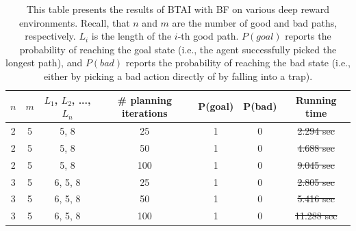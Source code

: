 \documentclass[twoside,11pt]{article}
\providecommand{\DIFadd}[1]{{\protect\color{blue}\uwave{#1}}} %
\providecommand{\DIFdel}[1]{{\protect\color{red}\sout{#1}}}                      %
\providecommand{\DIFaddFL}[1]{\DIFadd{#1}} %
\providecommand{\DIFdelFL}[1]{\DIFdel{#1}} %
\providecommand{\DIFaddbeginFL}{} %
\providecommand{\DIFaddendFL}{} %
\providecommand{\DIFdelbeginFL}{} %
\providecommand{\DIFdelendFL}{} %
\begin{document}
\begin{table}[H]
\centering
\begin{tabular}{ |c|c|c|c|c|c|c| }
 \hline
 $n$ & $m$ & $L_1$, $L_2$, ..., $L_n$  & \# planning iterations & P(goal) & P(bad) & Running time \DIFaddbeginFL \DIFaddFL{(ms)}\DIFaddendFL \\
 \hline
 2 & 5 & 5, 8 & 25 & 1 & 0 & \DIFdelbeginFL \DIFdelFL{2.294 sec}\DIFdelendFL \DIFaddbeginFL \DIFaddFL{$23.42 \pm 4.966$ }\DIFaddendFL \\
 \hline
 2 & 5 & 5, 8 & 50 & 1 & 0 & \DIFdelbeginFL \DIFdelFL{4.688 sec}\DIFdelendFL \DIFaddbeginFL \DIFaddFL{$43.37 \pm 2.743$}\DIFaddendFL \\
 \hline
 2 & 5 & 5, 8 & 100 & 1 & 0 & \DIFdelbeginFL \DIFdelFL{9.045 sec}\DIFdelendFL \DIFaddbeginFL \DIFaddFL{$110.58 \pm 29.586$}\DIFaddendFL \\
 \hline
 3 & 5 & 6, 5, 8 & 25 & 1 & 0 & \DIFdelbeginFL \DIFdelFL{2.805 sec}\DIFdelendFL \DIFaddbeginFL \DIFaddFL{$26.7 \pm 2.405$}\DIFaddendFL \\
 \hline
 3 & 5 & 6, 5, 8 & 50 & 1 & 0 & \DIFdelbeginFL \DIFdelFL{5.416 sec}\DIFdelendFL \DIFaddbeginFL \DIFaddFL{$61.41 \pm 45.112$}\DIFaddendFL \\
 \hline
 3 & 5 & 6, 5, 8 & 100 & 1 & 0 & \DIFdelbeginFL \DIFdelFL{11.288 sec}\DIFdelendFL \DIFaddbeginFL \DIFaddFL{$120.25 \pm 12.722$}\DIFaddendFL \\
 \hline
\end{tabular}
\caption{This table presents the results of BTAI with BF on various deep reward environments. Recall, that $n$ and $m$ are the number of good and bad paths, respectively. $L_i$ is the length of the $i$-th good path. $P(goal)$ reports the probability of reaching the goal state (i.e., the agent successfully picked the longest path), and $P(bad)$ reports the probability of reaching the bad state (i.e., either by picking a bad action directly of by falling into a trap).}
\label{tab:1}
\end{table}
\end{document}
